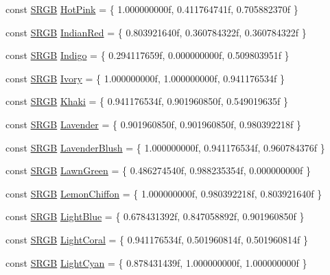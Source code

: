 \begin{DoxyCompactItemize}
const \hyperlink{structmage_1_1_s_r_g_b}{S\+R\+GB} \hyperlink{namespacemage_1_1color_a6c71449f3f78861ed803b42056590c6b}{Hot\+Pink} = \{ 1.\+000000000f, 0.\+411764741f, 0.\+705882370f \}
\item 
const \hyperlink{structmage_1_1_s_r_g_b}{S\+R\+GB} \hyperlink{namespacemage_1_1color_a2ecd17afc164bd43c8e9235fc1603742}{Indian\+Red} = \{ 0.\+803921640f, 0.\+360784322f, 0.\+360784322f \}
\item 
const \hyperlink{structmage_1_1_s_r_g_b}{S\+R\+GB} \hyperlink{namespacemage_1_1color_a7397ee3a10a75c693c81b667e55f207a}{Indigo} = \{ 0.\+294117659f, 0.\+000000000f, 0.\+509803951f \}
\item 
const \hyperlink{structmage_1_1_s_r_g_b}{S\+R\+GB} \hyperlink{namespacemage_1_1color_a96cd8c7b824259d3270613b6d6cebcd2}{Ivory} = \{ 1.\+000000000f, 1.\+000000000f, 0.\+941176534f \}
\item 
const \hyperlink{structmage_1_1_s_r_g_b}{S\+R\+GB} \hyperlink{namespacemage_1_1color_ad82c80c9e33e2cea3ec76197619fec93}{Khaki} = \{ 0.\+941176534f, 0.\+901960850f, 0.\+549019635f \}
\item 
const \hyperlink{structmage_1_1_s_r_g_b}{S\+R\+GB} \hyperlink{namespacemage_1_1color_ac54cc5382207fe65e9e964959d9cd534}{Lavender} = \{ 0.\+901960850f, 0.\+901960850f, 0.\+980392218f \}
\item 
const \hyperlink{structmage_1_1_s_r_g_b}{S\+R\+GB} \hyperlink{namespacemage_1_1color_a55f528361edc185bbbe8b56bfe81a23c}{Lavender\+Blush} = \{ 1.\+000000000f, 0.\+941176534f, 0.\+960784376f \}
\item 
const \hyperlink{structmage_1_1_s_r_g_b}{S\+R\+GB} \hyperlink{namespacemage_1_1color_a44535b99e4687fb198362191ed65195c}{Lawn\+Green} = \{ 0.\+486274540f, 0.\+988235354f, 0.\+000000000f \}
\item 
const \hyperlink{structmage_1_1_s_r_g_b}{S\+R\+GB} \hyperlink{namespacemage_1_1color_a45dfec58d7638bc3cd1d2eb782feec97}{Lemon\+Chiffon} = \{ 1.\+000000000f, 0.\+980392218f, 0.\+803921640f \}
\item 
const \hyperlink{structmage_1_1_s_r_g_b}{S\+R\+GB} \hyperlink{namespacemage_1_1color_adba4da561e129c171e1e72fa11395add}{Light\+Blue} = \{ 0.\+678431392f, 0.\+847058892f, 0.\+901960850f \}
\item 
const \hyperlink{structmage_1_1_s_r_g_b}{S\+R\+GB} \hyperlink{namespacemage_1_1color_a115b4380958b3301e2c1d00c1e89bc72}{Light\+Coral} = \{ 0.\+941176534f, 0.\+501960814f, 0.\+501960814f \}
\item 
const \hyperlink{structmage_1_1_s_r_g_b}{S\+R\+GB} \hyperlink{namespacemage_1_1color_aa3a415c07db596251af383602d707b25}{Light\+Cyan} = \{ 0.\+878431439f, 1.\+000000000f, 1.\+000000000f \}

\end{DoxyCompactItemize}
